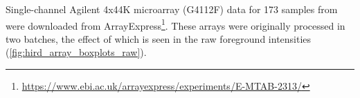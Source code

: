 %
Single-channel Agilent 4x44K microarray (G4112F) data for 173 samples from \autocite{sobolev2016AdjuvantedInfluenzaH1N1Vaccination} were downloaded from ArrayExpress\footnote{\url{https://www.ebi.ac.uk/arrayexpress/experiments/E-MTAB-2313/}}.
These arrays were originally processed in two batches, the effect of which is seen in the raw foreground intensities (\autoref{fig:hird_array_boxplots_raw}).


